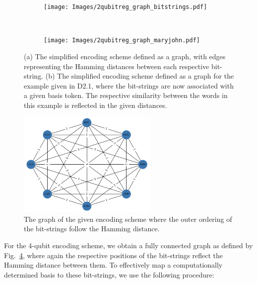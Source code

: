 \begin{figure}[htbp]
     \centering
     \begin{subfigure}[b]{0.45\textwidth}
         \centering
         \texttt{[image: Images/2qubitreg\_graph\_bitstrings.pdf]}
         \caption{}
         \label{fig:2qreg_basis}
     \end{subfigure}
     \hspace{1ex}
     \unskip\ \vrule
     \hspace{1ex}
     \begin{subfigure}[b]{0.45\textwidth}
         \centering
         \texttt{[image: Images/2qubitreg\_graph\_maryjohn.pdf]}
         \caption{}
         \label{fig:2qreg_basis}
     \end{subfigure}
        \caption{(a) The simplified encoding scheme defined as a graph, with edges representing the Hamming distances between each respective bit-string. (b) The simplified encoding scheme defined as a graph for the example given in D2.1, where the bit-strings are now associated with a given basis token. The respective similarity between the words in this example is reflected in the given distances. }
        \label{fig:2q_example_encoding}
\end{figure}

\begin{figure}[htbp]
    \centering
    \includegraphics[width=0.6\textwidth]{Images/4qubitreg_graph_bitstrings.png}
    \caption{The graph of the given encoding scheme where the outer ordering of the bit-strings follow the Hamming distance.}
    \label{fig:4q_example_encoding}
\end{figure}

For the 4-qubit encoding scheme, we obtain a fully connected graph as defined by Fig.~\ref{fig:4q_example_encoding}, where again the respective positions of the bit-strings reflect the Hamming distance between them. To effectively map a computationally determined basis to these bit-strings, we use the following procedure:

